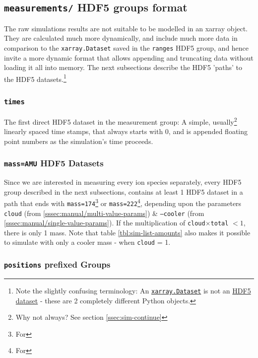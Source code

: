 \subsection{\texttt{measurements/} HDF5 groups format}\label{ssec:HDF5-measurements-format}

The raw simulations results are not suitable to be modelled in an xarray object. They are calculated much more dynamically, and include much more data in comparison to the \texttt{xarray.Dataset} saved in the \texttt{ranges} HDF5 group, and hence invite a more dynamic format that allows appending and truncating data without loading it all into memory. The next subsections describe the HDF5 'paths' to the HDF5 datasets.\footnote{Note the slightly confusing terminology: An \href{https://docs.xarray.dev/en/stable/generated/xarray.Dataset.html}{\texttt{xarray.Dataset}} is not an \href{https://docs.h5py.org/en/stable/high/dataset.html}{HDF5 dataset} - these are 2 completely different Python objects.}

\subsubsection{\texttt{times}}

The first direct HDF5 dataset in the measurement group: A simple, usually\footnote{Why not always? See section \ref{ssec:sim-continue}} linearly spaced time stamps, that always starts with 0, and is appended floating point numbers as the simulation's time proceeds.

\subsubsection{\texttt{mass=AMU} HDF5 Datasets}

Since we are interested in measuring every ion species separately, every HDF5 group described in the next subsections, contains at least 1 HDF5 dataset in a path that ends with \texttt{mass=174}\footnote{For } or \texttt{mass=222}\footnote{For }, depending upon the parameters \texttt{cloud} (from \ref{sssec:manual/multi-value-params}) \& \texttt{--cooler} (from \ref{sssec:manual/single-value-params}). If the multiplication of \texttt{cloud}$\times$\texttt{total} $<1$, there is only 1 mass. Note that table \ref{tbl:sim-list-amounts} also makes it possible to simulate with only a cooler mass - when \texttt{cloud} = 1.

\subsubsection{\texttt{positions} prefixed Groups}

